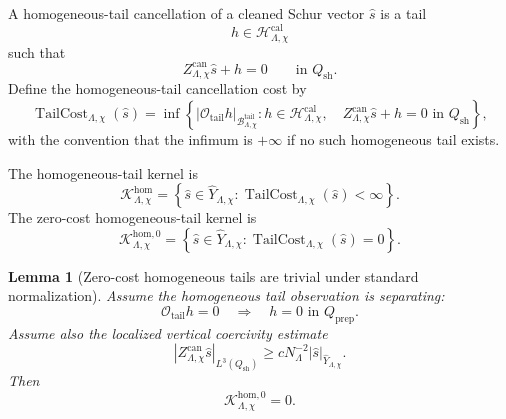 \documentclass[11pt]{article}
\numberwithin{equation}{section}
\newtheorem{lemma}[theorem]{Lemma}
\begin{document}
A homogeneous-tail cancellation of a cleaned Schur vector \(\widehat s\) is a tail
\[
h\in \mathcal H_{\Lambda,\chi}^{\mathrm{cal}}
\]
such that
\begin{equation}
Z_{\Lambda,\chi}^{\mathrm{can}}\widehat s+h=0
\qquad
\text{in }Q_{\mathrm{sh}}.
\label{eq:tag-10-222}
\end{equation}
Define the homogeneous-tail cancellation cost by
\begin{equation}
\operatorname{TailCost}_{\Lambda,\chi}(\widehat s) =
\inf
\left\{
|\mathcal O_{\mathrm{tail}}h|_{\mathcal B_{\Lambda,\chi}^{\mathrm{tail}}}:
h\in\mathcal H_{\Lambda,\chi}^{\mathrm{cal}},
\quad
Z_{\Lambda,\chi}^{\mathrm{can}}\widehat s+h=0
\text{ in }Q_{\mathrm{sh}}
\right\},
\label{eq:tag-10-223}
\end{equation}
with the convention that the infimum is \(+\infty\) if no such homogeneous tail exists.

The homogeneous-tail kernel is
\begin{equation}
\mathcal K_{\Lambda,\chi}^{\mathrm{hom}} =
\left\{
\widehat s\in\widehat Y_{\Lambda,\chi}:
\operatorname{TailCost}_{\Lambda,\chi}(\widehat s)<\infty
\right\}.
\label{eq:tag-10-224}
\end{equation}
The zero-cost homogeneous-tail kernel is
\begin{equation}
\mathcal K_{\Lambda,\chi}^{\mathrm{hom},0} =
\left\{
\widehat s\in\widehat Y_{\Lambda,\chi}:
\operatorname{TailCost}_{\Lambda,\chi}(\widehat s)=0
\right\}.
\label{eq:tag-10-225}
\end{equation}

\begin{lemma}[Zero-cost homogeneous tails are trivial under standard normalization]
Assume the homogeneous tail observation is separating:
\begin{equation}
\mathcal O_{\mathrm{tail}}h=0
\quad\Longrightarrow\quad
h=0
\text{ in }Q_{\mathrm{prep}}.
\label{eq:tag-10-226}
\end{equation}
Assume also the localized vertical coercivity estimate
\begin{equation}
|Z_{\Lambda,\chi}^{\mathrm{can}}\widehat s|_{L^3(Q_{\mathrm{sh}})}
\ge
cN_\Lambda^{-2}
|\widehat s|_{\widehat Y_{\Lambda,\chi}}.
\label{eq:tag-10-227}
\end{equation}
Then
\[
\mathcal K_{\Lambda,\chi}^{\mathrm{hom},0} =
{0}.
\]

\end{lemma}
\end{document}

